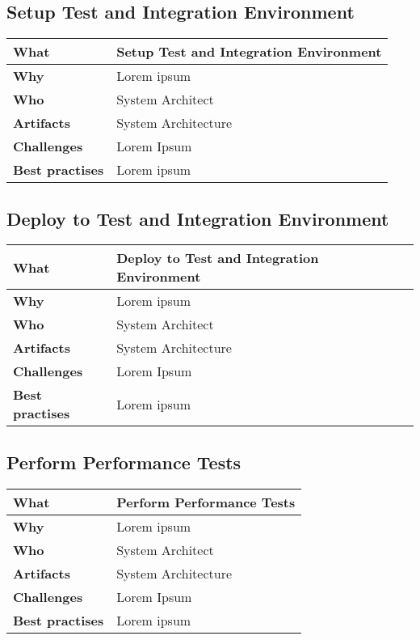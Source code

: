 \subsection{Setup Test and Integration Environment}
 \label{table:ch6_Task_Setup_Test_Environment}
\begin{tabular}
	{|m{3cm}|m{10cm}|} \hline \bfseries What & Setup Test and Integration Environment\\
	\hline \bfseries Why & Lorem ipsum\\
	\hline \bfseries Who & System Architect\\
	\hline \bfseries Artifacts & System Architecture\\
	\hline \bfseries Challenges & Lorem Ipsum\\
	\hline \bfseries Best practises & Lorem ipsum\\
	\hline 
\end{tabular}

\subsection{Deploy to Test and Integration Environment}
 \label{table:ch6_Task_Deploy}
\begin{tabular}
	{|m{3cm}|m{10cm}|} \hline \bfseries What & Deploy to Test and Integration Environment\\
	\hline \bfseries Why & Lorem ipsum\\
	\hline \bfseries Who & System Architect\\
	\hline \bfseries Artifacts & System Architecture\\
	\hline \bfseries Challenges & Lorem Ipsum\\
	\hline \bfseries Best practises & Lorem ipsum\\
	\hline 
\end{tabular}

\subsection{Perform Performance Tests}
 \label{table:ch6_Task_Perform_Performance_Tests}
\begin{tabular}
	{|m{3cm}|m{10cm}|} \hline \bfseries What & Perform Performance Tests\\
	\hline \bfseries Why & Lorem ipsum\\
	\hline \bfseries Who & System Architect\\
	\hline \bfseries Artifacts & System Architecture\\
	\hline \bfseries Challenges & Lorem Ipsum\\
	\hline \bfseries Best practises & Lorem ipsum\\
	\hline 
\end{tabular}

